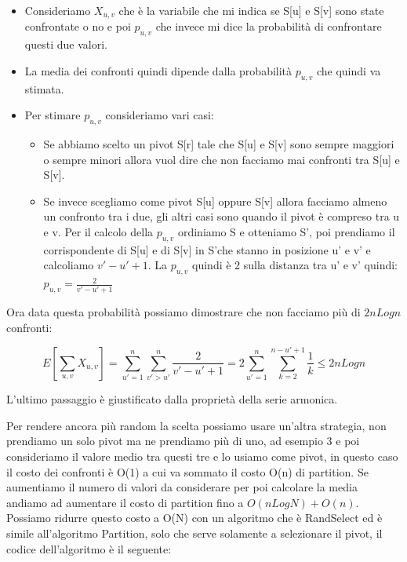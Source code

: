 \documentclass[14pt]{extreport}
\begin{document}
\begin{itemize}
    \item Consideriamo $X_{u,v}$ che è la variabile che mi indica se S[u] e S[v] sono state confrontate o no e poi $p_{u,v}$ che invece mi dice la probabilità di confrontare questi due valori.
    \item La media dei confronti quindi dipende dalla probabilità $p_{u,v}$ che quindi va stimata.
    \item Per stimare $p_{u,v}$ consideriamo vari casi:
        \begin{itemize}
            \item Se abbiamo scelto un pivot S[r] tale che S[u] e S[v] sono sempre maggiori o sempre minori allora vuol dire che non facciamo mai confronti tra S[u] e S[v].
            \item Se invece scegliamo come pivot S[u] oppure S[v] allora facciamo almeno un confronto tra i due, gli altri casi sono quando il pivot è compreso tra u e v.
            Per il calcolo della $p_{u,v}$ ordiniamo S e otteniamo S', poi prendiamo il corrispondente di S[u] e di S[v] in S'che stanno in posizione u' e v' e calcoliamo $v'-u'+1$.
            La $p_{u,v}$ quindi è 2 sulla distanza tra u' e v' quindi: $p_{u,v} = \frac{2}{v'-u'+1}$ 
        \end{itemize}
\end{itemize}
Ora data questa probabilità possiamo dimostrare che non facciamo più di $2nLogn$ confronti:

\begin{equation}
    E[\sum_{u,v}X_{u,v}] = \sum_{u'=1}^{n} \sum_{v'>u'}^{n} \frac{2}{v'-u'+1} = 2 \sum_{u'=1}^{n} \sum_{k=2}^{n-u'+1} \frac{1}{k} \leq 2nLogn
\end{equation}

L'ultimo passaggio è giustificato dalla proprietà della serie armonica.


Per rendere ancora più random la scelta possiamo usare un'altra strategia, non prendiamo un solo pivot ma ne prendiamo più di uno, ad esempio 3 e poi consideriamo il valore medio tra questi tre e lo usiamo come pivot, in questo caso il costo dei confronti è O(1) a cui va sommato il costo O(n) di partition. Se aumentiamo il numero di valori da considerare per poi calcolare la media andiamo ad aumentare il costo di partition fino a $O(nLogN)+O(n)$.
Possiamo ridurre questo costo a O(N) con un algoritmo che è RandSelect ed è simile all'algoritmo Partition, solo che serve solamente a selezionare il pivot, il codice dell'algoritmo è il seguente:
\end{document}
